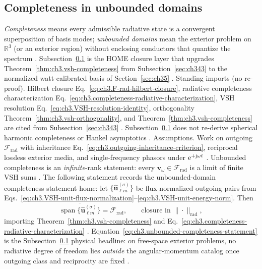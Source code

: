 \subsection{Completeness in unbounded domains}
\label{sec:ch361}
\emph{Completeness} means every admissible radiative state is a convergent superposition of basis modes;
\emph{unbounded domains} mean the exterior problem on \(\mathbb{R}^{3}\) (or an exterior region) without
enclosing conductors that quantize the spectrum \cite{stratton1941}. Subsection~\ref{sec:ch361}
is the HOME closure layer that upgrades Theorem~\ref{thm:ch3.vsh-completeness} from Subsection~\ref{sec:ch343}
to the normalized watt-calibrated basis of Section~\ref{sec:ch35} \cite{harrington2001}.
Standing imports (no re-proof). Hilbert closure Eq.~\eqref{eq:ch3.F-rad-hilbert-closure}, radiative completeness characterization
Eq.~\eqref{eq:ch3.completeness-radiative-characterization}, VSH resolution
Eq.~\eqref{eq:ch3.VSH-resolution-identity}, orthogonality Theorem~\ref{thm:ch3.vsh-orthogonality}, and
Theorem~\ref{thm:ch3.vsh-completeness} are cited from Subsection~\ref{sec:ch343} \cite{hansen1988}.
Subsection~\ref{sec:ch361} does not re-derive spherical harmonic completeness or Hankel asymptotics
\cite{kato1995}.
Assumptions. Work on outgoing \(\mathcal{F}_{\mathrm{rad}}\) with inheritance
Eq.~\eqref{eq:ch3.outgoing-inheritance-criterion}, reciprocal lossless exterior media, and single-frequency
phasors under $\mathrm{e}^{+\mathrm{j}\omega t}$ \cite{stratton1941}. Unbounded completeness is an
\emph{infinite}-rank statement: every \(\mathbf{v}_\omega\in\mathcal{F}_{\mathrm{rad}}\) is a limit of finite
VSH sums \cite{kato1995}.
The following statement records the unbounded-domain completeness statement home: let \(\{\widehat{\mathbf{u}}_{\ell m}^{(\sigma)}\}\) be flux-normalized outgoing pairs from
Eqs.~\eqref{eq:ch3.VSH-unit-flux-normalization}--\eqref{eq:ch3.VSH-unit-energy-norm}. Then
\begin{equation}
\label{eq:ch3.unbounded-completeness-statement}
\overline{\operatorname{span}\{\widehat{\mathbf{u}}_{\ell m}^{(\sigma)}\}}
=
\mathcal{F}_{\mathrm{rad}},
\qquad
\text{closure in }\|\cdot\|_{\mathrm{rad}},
\end{equation}
importing Theorem~\ref{thm:ch3.vsh-completeness} and Eq.~\eqref{eq:ch3.completeness-radiative-characterization}
\cite{hansen1988}. Equation~\eqref{eq:ch3.unbounded-completeness-statement} is the
Subsection~\ref{sec:ch361} physical headline: on free-space exterior problems, no radiative degree of freedom lies
\emph{outside} the angular-momentum catalog once outgoing class and reciprocity are fixed \cite{harrington2001}.
